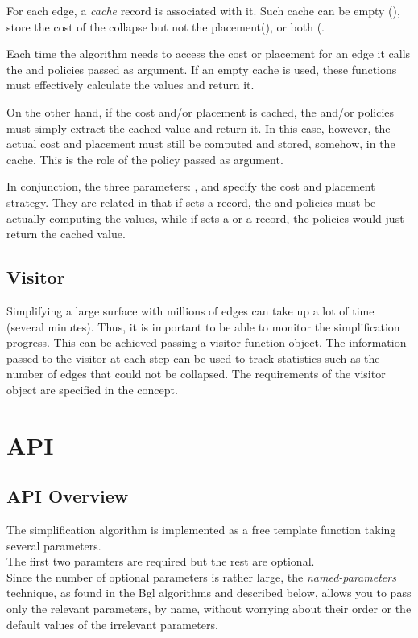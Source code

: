 For each edge, a {\em cache} record is associated with it. 
Such cache can be empty (), store the cost of the collapse but not the 
placement(), or both (.

Each time the algorithm needs to access the cost or placement for an edge
it calls the  and  policies passed 
as argument. If an empty cache is used, these functions must effectively
calculate the values and return it.

On the other hand, if the cost and/or placement is cached, the 
and/or  policies must simply extract the cached value and return it. 
In this case, however, the actual cost and placement must still be computed and stored,
somehow, in the cache.
This is the role of the  policy passed as argument.

In conjunction, the three parameters: ,  and  
specify the cost and placement strategy. They are related in that if 
sets a  record, the  and  policies must be actually
computing the values, while if  sets a  or a 
record, the policies would just return the cached value.

\subsection{Visitor}

Simplifying a large surface with millions of edges can take up a lot of time (several minutes). Thus, it is important to be able to monitor the simplification progress. This can be achieved passing a visitor function object. The information passed to the visitor at each step can be used to track statistics such as the number of edges that could not be collapsed. The requirements of the visitor object are specified in the  concept.

\section{API}

\subsection{API Overview}

The simplification algorithm is implemented as a free template function taking several parameters.\\
The first two paramters are required but the rest are optional.\\
Since the number of optional parameters is rather large, the {\em named-parameters} technique, 
as found in the {\sc Bgl} 
algorithms and described below, allows you to pass only the relevant parameters, by name, 
without worrying about their order or the default values of the irrelevant parameters.

